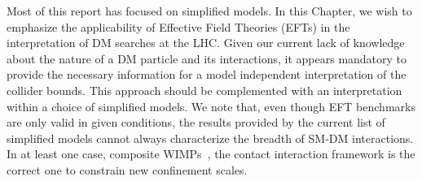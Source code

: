 
Most of this report has focused on simplified models.
In this Chapter, we wish to emphasize the applicability of
Effective Field Theories (EFTs) 
in the interpretation of DM searches at the LHC.
Given our current lack of knowledge about the nature of a DM particle and
its interactions, it appears mandatory to provide the necessary information
for a model independent interpretation of the collider bounds.
This approach should be complemented with
an interpretation within a choice of simplified models.
We note that, even though EFT benchmarks are only valid in given conditions,
the results provided by the current list of simplified models cannot always
characterize the breadth of SM-DM interactions.
In at least one case, composite WIMPs~\cite{Nussinov:1985xr,Kaplan:1991ah,Banks:2010eh}, 
the contact interaction framework is the correct one to
constrain new confinement scales. 

